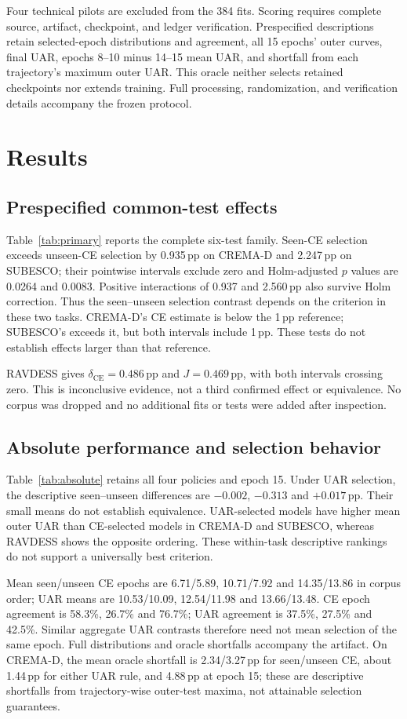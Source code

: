 \documentclass[letterpaper]{article}
\begin{document}
Four technical pilots are excluded from the 384 fits. Scoring requires
complete source, artifact, checkpoint, and ledger verification. Prespecified
descriptions retain selected-epoch distributions and agreement, all
15 epochs' outer curves, final UAR, epochs 8--10 minus 14--15 mean UAR,
and shortfall from each trajectory's maximum outer UAR. This oracle
neither selects retained checkpoints nor extends training. Full processing,
randomization, and verification details accompany the frozen protocol.

\section{Results}
\subsection{Prespecified common-test effects}
Table~\ref{tab:primary} reports the complete six-test family. Seen-CE selection exceeds unseen-CE selection by 0.935\,pp on CREMA-D and 2.247\,pp on SUBESCO; their pointwise intervals exclude zero and Holm-adjusted $p$ values are 0.0264 and 0.0083. Positive interactions of 0.937 and 2.560\,pp also survive Holm correction. Thus the seen--unseen selection contrast depends on the criterion in these two tasks. CREMA-D's CE estimate is below the 1\,pp reference; SUBESCO's exceeds it, but both intervals include 1\,pp. These tests do not establish effects larger than that reference.

RAVDESS gives $\delta_{\mathrm{CE}}=0.486$\,pp and $J=0.469$\,pp, with both intervals crossing zero. This is inconclusive evidence, not a third confirmed effect or equivalence. No corpus was dropped and no additional fits or tests were added after inspection.

\subsection{Absolute performance and selection behavior}
Table~\ref{tab:absolute} retains all four policies and epoch 15. Under UAR selection, the descriptive seen--unseen differences are $-0.002$, $-0.313$ and $+0.017$\,pp. Their small means do not establish equivalence. UAR-selected models have higher mean outer UAR than CE-selected models in CREMA-D and SUBESCO, whereas RAVDESS shows the opposite ordering. These within-task descriptive rankings do not support a universally best criterion.

Mean seen/unseen CE epochs are 6.71/5.89, 10.71/7.92 and 14.35/13.86 in corpus order; UAR means are 10.53/10.09, 12.54/11.98 and 13.66/13.48. CE epoch agreement is 58.3\%, 26.7\% and 76.7\%; UAR agreement is 37.5\%, 27.5\% and 42.5\%. Similar aggregate UAR contrasts therefore need not mean selection of the same epoch. Full distributions and oracle shortfalls accompany the artifact. On CREMA-D, the mean oracle shortfall is 2.34/3.27\,pp for seen/unseen CE, about 1.44\,pp for either UAR rule, and 4.88\,pp at epoch 15; these are descriptive shortfalls from trajectory-wise outer-test maxima, not attainable selection guarantees.
\end{document}
